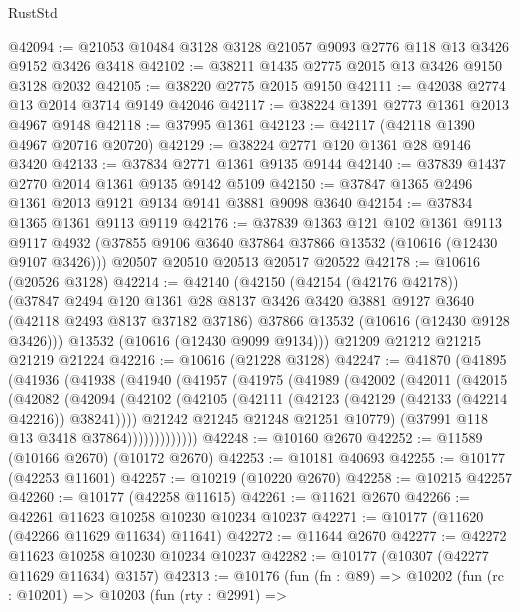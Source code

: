 \begin{lexlean}{RustStd}
\begin{coremodule}
@42094 := @21053 @10484 @3128 @3128 @21057 @9093 @2776 @118 @13 @3426 @9152 @3426 @3418
@42102 := @38211 @1435 @2775 @2015 @13 @3426 @9150 @3128 @2032
@42105 := @38220 @2775 @2015 @9150
@42111 := @42038 @2774 @13 @2014 @3714 @9149 @42046
@42117 := @38224 @1391 @2773 @1361 @2013 @4967 @9148
@42118 := @37995 @1361
@42123 := @42117 (@42118 @1390 @4967 @20716 @20720)
@42129 := @38224 @2771 @120 @1361 @28 @9146 @3420
@42133 := @37834 @2771 @1361 @9135 @9144
@42140 := @37839 @1437 @2770 @2014 @1361 @9135 @9142 @5109
@42150 := @37847 @1365 @2496 @1361 @2013 @9121 @9134 @9141 @3881 @9098 @3640
@42154 := @37834 @1365 @1361 @9113 @9119
@42176 := @37839
    @1363
    @121
    @102
    @1361
    @9113
    @9117
    @4932
    (@37855 @9106 @3640 @37864 @37866 @13532 (@10616 (@12430 @9107 @3426)))
    @20507
    @20510
    @20513
    @20517
    @20522
@42178 := @10616 (@20526 @3128)
@42214 := @42140
    (@42150
      (@42154 (@42176 @42178))
      (@37847
        @2494
        @120
        @1361
        @28
        @8137
        @3426
        @3420
        @3881
        @9127
        @3640
        (@42118 @2493 @8137 @37182 @37186)
        @37866
        @13532
        (@10616 (@12430 @9128 @3426)))
      @13532
      (@10616 (@12430 @9099 @9134)))
    @21209
    @21212
    @21215
    @21219
    @21224
@42216 := @10616 (@21228 @3128)
@42247 := @41870
    (@41895
      (@41936
        (@41938
          (@41940
            (@41957
              (@41975
                (@41989
                  (@42002
                    (@42011
                      (@42015
                        (@42082
                          (@42094
                            (@42102
                              (@42105 (@42111 (@42123 (@42129 (@42133 (@42214 @42216)) @38241))))
                              @21242
                              @21245
                              @21248
                              @21251
                              @10779)
                            (@37991 @118 @13 @3418 @37864)))))))))))))
@42248 := @10160 @2670
@42252 := @11589 (@10166 @2670) (@10172 @2670)
@42253 := @10181 @40693
@42255 := @10177 (@42253 @11601)
@42257 := @10219 (@10220 @2670)
@42258 := @10215 @42257
@42260 := @10177 (@42258 @11615)
@42261 := @11621 @2670
@42266 := @42261 @11623 @10258 @10230 @10234 @10237
@42271 := @10177 (@11620 (@42266 @11629 @11634) @11641)
@42272 := @11644 @2670
@42277 := @42272 @11623 @10258 @10230 @10234 @10237
@42282 := @10177 (@10307 (@42277 @11629 @11634) @3157)
@42313 := @10176
    (fun (fn : @89) =>
    @10202
      (fun (rc : @10201) =>
      @10203
        (fun (rty : @2991) =>

\end{coremodule}
\end{lexlean}
